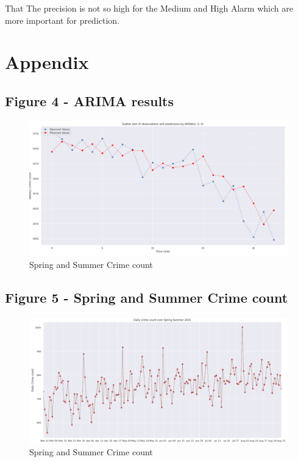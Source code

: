\documentclass[a4paper, twocolumn]{article}
\begin{document}
That The precision is not so high for the Medium and High Alarm which are more important
for prediction.

\onecolumn
\appendix

\section{Appendix}


\subsection{Figure 4 - ARIMA results}\label{appendix:fig5}
\begin{figure}[h]
\includegraphics[width=\textwidth]{fig6.png}
\caption{Spring and Summer Crime count}
\end{figure}

\subsection{Figure 5 - Spring and Summer Crime count}\label{appendix:fig3}
\begin{figure}[h]
\includegraphics[width=\textwidth]{fig3.png}
\caption{Spring and Summer Crime count}
\end{figure}
\end{document}
